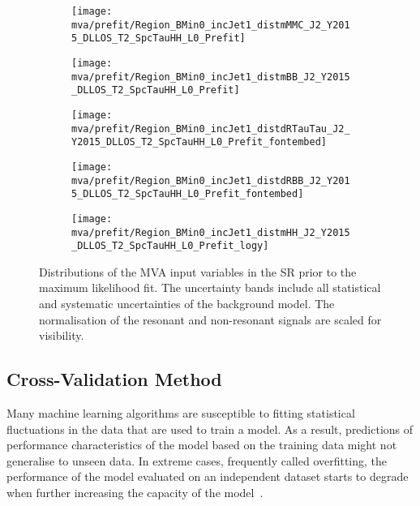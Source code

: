 \begin{figure}[htbp]
  \centering

  \begin{subfigure}[t]{.46\textwidth}
    \texttt{[image: mva/prefit/Region\_BMin0\_incJet1\_distmMMC\_J2\_Y2015\_DLLOS\_T2\_SpcTauHH\_L0\_Prefit]}
  \end{subfigure}\hfill %
  \begin{subfigure}[t]{.46\textwidth}
    \texttt{[image: mva/prefit/Region\_BMin0\_incJet1\_distmBB\_J2\_Y2015\_DLLOS\_T2\_SpcTauHH\_L0\_Prefit]}
  \end{subfigure}

  \begin{subfigure}[t]{.46\textwidth}
    \texttt{[image: mva/prefit/Region\_BMin0\_incJet1\_distdRTauTau\_J2\_Y2015\_DLLOS\_T2\_SpcTauHH\_L0\_Prefit\_fontembed]}
  \end{subfigure}\hfill %
  \begin{subfigure}[t]{.46\textwidth}
    \texttt{[image: mva/prefit/Region\_BMin0\_incJet1\_distdRBB\_J2\_Y2015\_DLLOS\_T2\_SpcTauHH\_L0\_Prefit\_fontembed]}
  \end{subfigure}

  \begin{subfigure}[t]{.46\textwidth}
    \texttt{[image: mva/prefit/Region\_BMin0\_incJet1\_distmHH\_J2\_Y2015\_DLLOS\_T2\_SpcTauHH\_L0\_Prefit\_logy]}
  \end{subfigure}

  \caption[Distributions of the MVA input variables in the \hadhad
  SR.]{Distributions of the MVA input variables in the \hadhad SR prior to the
    maximum likelihood fit. The uncertainty bands include all statistical and
    systematic uncertainties of the background model. The normalisation of the
    resonant and non-resonant \HH signals are scaled for visibility.}%
  \label{fig:mva_inputs}
\end{figure}


\subsection{Cross-Validation Method}
\label{sec:mva_crossvalidation}

Many machine learning algorithms
are susceptible to fitting statistical fluctuations in the data that are used to
train a model. As a result, predictions of performance characteristics of the
model based on the training data might not generalise to unseen data. In extreme
cases, frequently called overfitting, the performance of the model evaluated on
an independent dataset starts to degrade when further increasing the capacity of
the model~\cite{hastie09}.


